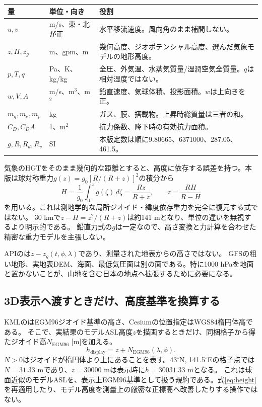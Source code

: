 \documentclass[11pt,a4paper]{article}
\newcommand{\code}[1]{\texttt{\detokenize{#1}}}
\begin{document}
\begin{longtable}{@{}p{.19\linewidth}p{.26\linewidth}p{.49\linewidth}@{}}
\toprule 量 & 単位・向き & 役割 \\\midrule\endhead
$u,v$ & m/s、東・北が正 & 水平移流速度。風向角のまま補間しない。\\
$z,H,z_g$ & m、gpm、m & 幾何高度、ジオポテンシャル高度、選んだ気象モデルの地形高度。\\
$p,T,q$ & Pa、K、kg/kg & 全圧、外気温、水蒸気質量/湿潤空気全質量。$q$は相対湿度ではない。\\
$w,V,A$ & m/s、m$^3$、m$^2$ & 鉛直速度、気球体積、投影面積。$w$は上向きを正。\\
$m_g,m_e,m_p$ & kg & ガス、膜、搭載物。上昇時総質量は三者の和。\\
$C_D,C_DA$ & 1、m$^2$ & 抗力係数、降下時の有効抗力面積。\\
$g,R,R_d,R_v$ & SI & 本版定数は順に9.80665、6371000、287.05、461.5。\\\bottomrule
\end{longtable}

気象のHGTをそのまま幾何的な距離とすると、高度に依存する誤差を持つ。本版は球対称重力$g(z)=g_0[R/(R+z)]^2$の積分から
\begin{equation}
 H=\frac{1}{g_0}\int_0^z g(\zeta)\,d\zeta=\frac{Rz}{R+z},\qquad
 z=\frac{RH}{R-H}
 \label{eq:height}
\end{equation}
を用いる。これは測地学的な局所ジオイド・緯度依存重力を完全に復元する式ではない。
30 kmで$z-H=z^2/(R+z)$は約141 mとなり、単位の違いを無視するより明示的である。
鉛直力式の$g$は一定なので、高さ変換と力計算を合わせた精密な重力モデルを主張しない。

APIの\code{height_agl_m}は$z-z_g(t,\phi,\lambda)$であり、測量された地表からの高さではない。
GFSの粗い地形、実地表DEM、海面、最低気圧面は別の面である。特に1000 hPaを地面と置かないことが、山地を含む日本の地点へ拡張するために必要になる。

\subsection{3D表示へ渡すときだけ、高度基準を換算する}\label{th:display-height}
KMLの\code{absolute}はEGM96ジオイド基準の高さ、Cesiumの位置指定はWGS84楕円体高である。
そこで、実結果のモデルASL高度$z$を描画するときだけ、同梱格子から得たジオイド高$N_{\mathrm{EGM96}}$ [m]を加える。
\begin{equation}
 h_{\mathrm{display}}=z+N_{\mathrm{EGM96}}(\lambda,\phi).
 \label{eq:display-height}
\end{equation}
$N>0$はジオイドが楕円体より上にあることを表す。43$^\circ$N, 141.5$^\circ$Eの格子点では$N=31.33$ mであり、$z=30000$ mは表示時に$h=30031.33$ mとなる。
これは球面近似のモデルASLを、表示上EGM96基準として扱う規約である。式\eqref{eq:height}を再適用したり、モデル高度を測量上の厳密な正標高へ改善したりする操作ではない。
\end{document}
